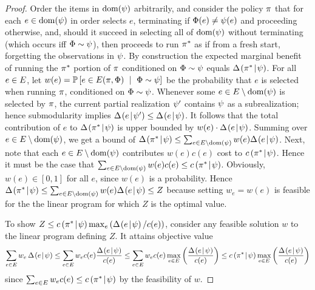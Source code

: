 \begin{proof} 
%
%
%
Order the items in $\dom(\prlz)$ arbitrarily, and 
consider the policy $\policy$ that for each $e \in \dom(\prlz)$ in
order selects $e$, terminating if $\rvrlz(e) \neq \prlz(e)$ and
proceeding otherwise, and, should it succeed in selecting all of
$\dom(\prlz)$ without terminating (which occurs iff $\rvrlz \sim
\prlz$), then proceeds to run $\policy^*$ as if from a fresh start,
forgetting the observations in $\prlz$.
%
%
%
%
By construction 
the expected marginal benefit of running the $\policy^*$ portion of
$\policy$ conditioned on $\rvrlz \sim \prlz$ equals $\diff{\prlz}{\policy^*}$.
For all $e \in \groundset$, let $w(e) = \Pr{e \in
  \played{\policy}{\rvrlz} \ \mid \ \rvrlz \sim \prlz}$
be the probability that $e$ is selected when running $\policy$, 
conditioned on $\rvrlz \sim \prlz$.
Whenever some $e \in \groundset \setminus \dom(\prlz)$ is selected by $\policy$, the current partial realization
$\prlz'$ contains $\prlz$ as a subrealization; hence \term
submodularity implies $\diff{\prlz'}{e} \le \diff{\prlz}{e}$.
It follows that the total contribution of $e$ to $\diff{\prlz}{\policy^*}$
is upper
bounded by $w(e) \cdot \diff{\prlz}{e}$.
Summing over $e  \in \groundset \setminus \dom(\prlz)$, 
%
we get a bound of 
$\diff{\prlz}{\policy^*} \le \sum_{e  \in \groundset \setminus
     \dom(\prlz)} w(e) \diff{\prlz}{e}$.
Next, note that each $e \in \groundset \setminus
\dom(\prlz)$ contributes $w(e)c(e)$ cost to $\condcost{\prlz}{\policy^*}$.
Hence it must be the case that 
$\sum_{e  \in \groundset \setminus \dom(\prlz)} w(e)c(e) \le \condcost{\prlz}{\policy^*}$.
Obviously, $w(e) \in [0,1]$ for all $e$, since $w(e)$ is a probability.
Hence $\diff{\prlz}{\policy^*} \le \sum_{e  \in \groundset \setminus \dom(\prlz)} w(e)
\diff{\prlz}{e} \le Z$ because setting $w_e = w(e)$ is feasible for the
the linear program for which $Z$ is the optimal value.

%
%
%
%

To show $Z \le \condcost{\prlz}{\policy^*} \max_{e} \paren{\diff{\prlz}{e} /
  c(e)}$, consider any feasible solution $w$ to the linear program
defining $Z$.  It attains objective value 
$$\sum_{e \in \groundset} w_e \,\diff{\prlz}{e} \le \sum_{e \in
  \groundset} w_e c(e) \frac{\diff{\prlz}{e}}{c(e)} \le \sum_{e \in
  \groundset} w_e c(e) \max_{e \in \groundset} \paren{\frac{\diff{\prlz}{e}}{c(e)}} \le
\condcost{\prlz}{\policy^*}  \max_{e \in \groundset} \paren{\frac{\diff{\prlz}{e}}{c(e)}} $$
since $ \sum_{e \in \groundset} w_e c(e) \le \condcost{\prlz}{\policy^*} $ by
the feasibility of $w$.
\end{proof}

